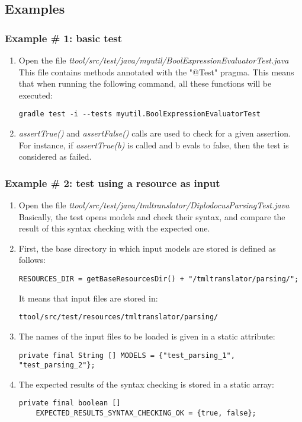 \documentclass[12pt]{article}
\begin{document}
\subsection{Examples}

\subsubsection{Example \# 1: basic test}

\begin{enumerate}
\item Open the file \textit{ttool/src/test/java/myutil/BoolExpressionEvaluatorTest.java}\\
This file contains methods annotated with the "@Test" pragma. This means that when running the following command, all these functions will be executed:
\begin{verbatim}
gradle test -i --tests myutil.BoolExpressionEvaluatorTest
\end{verbatim}
\item \textit{assertTrue()} and\textit{ assertFalse()} calls are used to check for a given assertion.  For instance, if \textit{ assertTrue(b)} is called and b evals to false, then the test is considered as failed.
\end{enumerate}

\subsubsection{Example \# 2: test using a resource as input}

\begin{enumerate}
\item Open the file \textit{ttool/src/test/java/tmltranslator/DiplodocusParsingTest.java}\\
Basically, the test opens models and check their syntax, and compare the result of this syntax checking with the expected one.
\item First, the base directory in which input models are stored is defined as follows:
\begin{verbatim}
RESOURCES_DIR = getBaseResourcesDir() + "/tmltranslator/parsing/";
\end{verbatim}
It means that input files are stored in:
\begin{verbatim}
ttool/src/test/resources/tmltranslator/parsing/
\end{verbatim}
\item The names of the input files to be loaded is given in a static attribute:
\begin{verbatim}
private final String [] MODELS = {"test_parsing_1", "test_parsing_2"};
\end{verbatim}
\item The expected results of the syntax checking is stored in a static array:
\begin{verbatim}
private final boolean [] 
    EXPECTED_RESULTS_SYNTAX_CHECKING_OK = {true, false};
\end{verbatim}
\end{enumerate}
\end{document}
